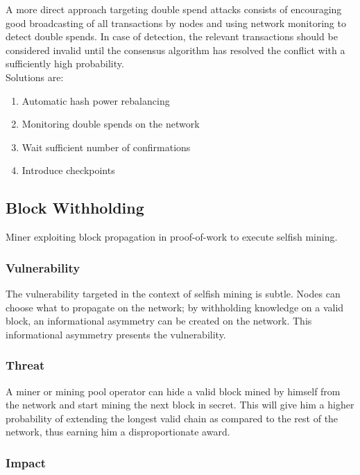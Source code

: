 \documentclass[11pt,a4paper,draft]{article}
\begin{document}
A more direct approach targeting double spend attacks consists of encouraging good broadcasting of all transactions by nodes and using network monitoring to detect double spends. In case of detection, the relevant transactions should be considered invalid until the consensus algorithm has resolved the conflict with a sufficiently high probability.\\

Solutions are:
\begin{enumerate}
  \item Automatic hash power rebalancing
  \item Monitoring double spends on the network
  \item Wait sufficient number of confirmations
  \item Introduce checkpoints
\end{enumerate}

\subsection{Block Withholding}

Miner exploiting block propagation in proof-of-work to execute selfish mining.\\

\subsubsection{Vulnerability}

The vulnerability targeted in the context of selfish mining is subtle. Nodes can choose what to propagate on the network; by withholding knowledge on a valid block, an informational asymmetry can be created on the network. This informational asymmetry presents the vulnerability.\\

\subsubsection{Threat}

A miner or mining pool operator can hide a valid block mined by himself from the network and start mining the next block in secret. This will give him a higher probability of extending the longest valid chain as compared to the rest of the network, thus earning him a disproportionate award.\\

\subsubsection{Impact}
\end{document}
